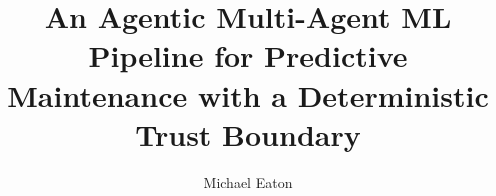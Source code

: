 \documentclass[5p,times]{elsarticle}
\begin{document}

\title{An Agentic Multi-Agent ML Pipeline for Predictive Maintenance with a Deterministic Trust Boundary}

\author[rit]{Michael Eaton}

\end{document}
